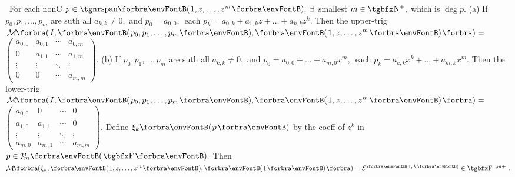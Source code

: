 \BulletPointX{} \,\,\,For each nonC $p\in\Span{1,z,\dots,z^m},\;\exists$ smallest $m\in\Nbp,$ which is $\deg p.$\TextB{}
(a) If $p_0,p_1,\dots,p_m$ are suth all $a_{k,k}\neq 0,$ and\TextB{}
\Hb $p_0=a_{0,0},\,$ each $p_k=a_{0,k}+a_{1,k}z+\dots+a_{k,k}z^k.$\TextB{\vspace{-18pt}}
\Ha Then the upper-trig $\Mt[\BigBigPar]{I,\Par{p_0,p_1,\dots,p_m},\Par{1,z,\dots,z^m}}={}${\small$\begin{pmatrix}
		a_{0,0} & a_{0,1} & \cdots & a_{0,m}\\
		0       & a_{1,1} & \cdots & a_{1,m}\\
		\vdots  & \vdots  & \ddots & \vdots\\
		0       & 0       & \cdots & a_{m,m}
	\end{pmatrix}$}.\TextB{\vspace{-8pt}}
(b) If $p_0,p_1,\dots,p_m$ are suth all $a_{k,k}\neq 0,$ and\TextB{}
\Hb $p_0=a_{0,0}+\dots+a_{m,0}x^m,\,$ each $p_k=a_{k,k}x^k+\dots+a_{m,k}x^m.$\TextB{\vspace{-18pt}}
\Hb Then the lower-trig \;$\Mt[\BigBigPar]{I,\Par{p_0,p_1,\dots,p_m},\Par{1,z,\dots,z^m}}={}${\small$\begin{pmatrix}
		a_{0,0} & 0       & \cdots & 0\\
		a_{1,0} & a_{1,1} & \cdots & 0\\
		\vdots  & \vdots  & \ddots & \vdots\\
		a_{m,0} & a_{m,1} & \cdots & a_{m,m}
	\end{pmatrix}$}.\TextB{\vspace{-12pt}}
\AComm Define $\xi_k\Par{p}$ by the coeff of $z^k$ in $p\in\PoF{m}.$\parCom\IndentB{}
Then $\Mt[\BigBigPar]{\xi_k,\Par{1,z,\dots,z^m},\Par{1}}=\mEnt{1,\,k}\in\FbbP{1,m+1}.$\vspace{-2pt}
\SepLine\pagebreak

